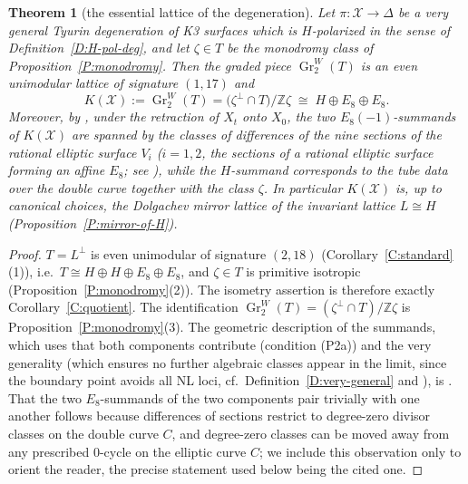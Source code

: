 \documentclass[11pt]{amsart}
\theoremstyle{plain}
\newtheorem{theorem}{Theorem}[section]
\theoremstyle{definition}
\theoremstyle{remark}
\numberwithin{equation}{section}
\begin{document}
\begin{theorem}[the essential lattice of the degeneration]\label{T:essential}
Let \(\pi\colon\mathcal X\to\Delta\) be a very general Tyurin degeneration of
K3 surfaces which is \(H\)-polarized in the sense of
Definition~\ref{D:H-pol-deg}, and let \(\zeta\in T\) be the monodromy class of
Proposition~\ref{P:monodromy}. Then the graded piece
\(\operatorname{Gr}^{W}_{2}(T)\) is an even unimodular lattice of signature
\((1,17)\) and
\[
K(\mathcal X):=\operatorname{Gr}^{W}_{2}(T)
=\bigl(\zeta^{\perp}\cap T\bigr)/\mathbb Z\zeta
\;\cong\;H\oplus E_{8}\oplus E_{8}.
\]
Moreover, by \cite[\S 3]{dfk3slpms}, under the retraction of \(X_{t}\) onto
\(X_{0}\), the two \(E_{8}(-1)\)-summands of \(K(\mathcal X)\) are spanned by
the classes of differences of the nine sections of the rational elliptic
surface \(V_{i}\) (\(i=1,2\), the sections of a rational elliptic surface
forming an affine \(E_{8}\); see \cite{miranda,schuttshioda}), while the
\(H\)-summand corresponds to the tube data over the double curve together
with the class \(\zeta\). In particular \(K(\mathcal X)\) is, up to canonical
choices, the Dolgachev mirror lattice of the invariant lattice \(L\cong H\)
(Proposition~\ref{P:mirror-of-H}).
\end{theorem}

\begin{proof}
\(T=L^{\perp}\) is even unimodular of signature \((2,18)\)
(Corollary~\ref{C:standard}(1)), i.e.\
\(T\cong H\oplus H\oplus E_{8}\oplus E_{8}\), and \(\zeta\in T\) is primitive
isotropic (Proposition~\ref{P:monodromy}(2)). The isometry assertion is
therefore exactly Corollary~\ref{C:quotient}. The identification
\(\operatorname{Gr}^{W}_{2}(T)= (\zeta^{\perp}\cap T)/\mathbb Z\zeta\) is
Proposition~\ref{P:monodromy}(3). The geometric description of the summands,
which uses that both components contribute (condition (P2a)) and the very
generality (which ensures no further algebraic classes appear in the limit,
since the boundary point avoids all NL loci, cf.\
Definition~\ref{D:very-general} and \cite{cmek3sspt}), is
\cite[\S 3]{dfk3slpms}. That the two \(E_{8}\)-summands of the two
components pair trivially with one another follows because differences of
sections restrict to degree-zero divisor classes on the double curve \(C\),
and degree-zero classes can be moved away from any prescribed
\(0\)-cycle on the elliptic curve \(C\); we include this observation only to
orient the reader, the precise statement used below being the cited one.
\end{proof}
\end{document}
